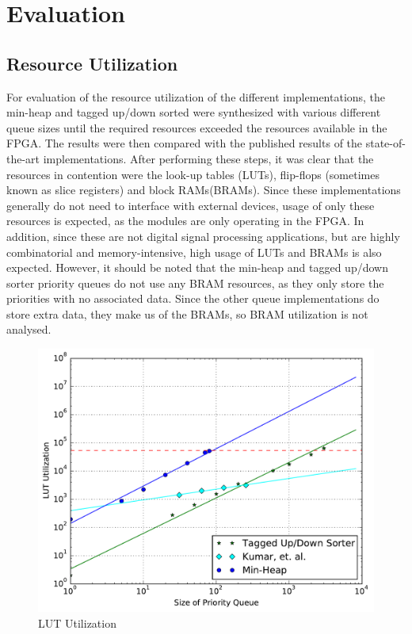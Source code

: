 \section{Evaluation}
\label{sec:eval}

\subsection{Resource Utilization}
For evaluation of the resource utilization of the different implementations, the min-heap and tagged up/down sorted were synthesized with various different queue sizes until the required resources exceeded the resources available in the FPGA. The results were then compared with the published results of the state-of-the-art implementations. After performing these steps, it was clear that the resources in contention were the look-up tables (LUTs), flip-flops (sometimes known as slice registers) and block RAMs(BRAMs). Since these implementations generally do not need to interface with external devices, usage of only these resources is expected, as the modules are only operating in the FPGA. In addition, since these are not digital signal processing applications, but are highly combinatorial and memory-intensive, high usage of LUTs and BRAMs is also expected. However, it should be noted that the min-heap and tagged up/down sorter priority queues do not use any BRAM resources, as they only store the priorities with no associated data. Since the other queue implementations do store extra data, they make us of the BRAMs, so BRAM utilization is not analysed.

\begin{figure}[t!]
	\centering
	\includegraphics[width=\columnwidth]{data/lut_utilization.pdf}
	\caption{LUT Utilization}
	\label{fig:luts}
\end{figure}

